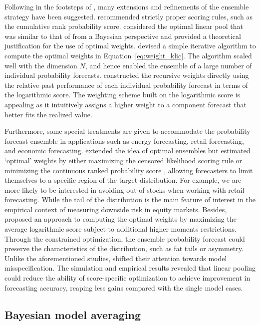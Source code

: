 \documentclass[11pt]{article}
\begin{document}
Following in the footsteps of \cite{Hall2007-lh}, many extensions and refinements of the ensemble strategy have been suggested. \cite{Gneiting2007-ij} recommended strictly proper scoring rules, such as the cumulative rank probability score. \cite{Geweke2011-xk} considered the optimal linear pool that was similar to that of \cite{Hall2007-lh} from a Bayesian perspective and provided a theoretical justification for the use of optimal weights. \cite{Conflitti2015-fq} devised a simple iterative algorithm to compute the optimal weights in Equation~\eqref{eq:weight_klic}. The algorithm scaled well with the dimension $N$, and hence enabled the ensemble of a large number of individual probability forecasts. \cite{Jore2010-yi} constructed the recursive weights directly using the relative past performance of each individual probability forecast in terms of the logarithmic score. The weighting scheme built on the logarithmic score is appealing as it intuitively assigns a higher weight to a component forecast that better fits the realized value.

Furthermore, some special treatments are given to accommodate the probability forecast ensemble in applications such as energy forecasting, retail forecasting, and economic forecasting. \cite{Opschoor2017-yu} extended the idea of optimal ensembles but estimated `optimal' weights by either maximizing the censored likelihood scoring rule \citep{Diks2011-gj} or minimizing the continuous ranked probability score \citep{Gneiting2014-tz}, allowing forecasters to limit themselves to a specific region of the target distribution. For example, we are more likely to be interested in avoiding out-of-stocks when working with retail forecasting. While the tail of the distribution is the main feature of interest in the empirical context of measuring downside risk in equity markets. Besides, \cite{Pauwels2020-zl} proposed an approach to computing the optimal weights by maximizing the average logarithmic score subject to additional higher moments restrictions. Through the constrained optimization, the ensemble probability forecast could preserve the characteristics of the distribution, such as fat tails or asymmetry. Unlike the aforementioned studies, \cite{Martin2021-yi} shifted their attention towards model misspecification. The simulation and empirical results revealed that linear pooling could reduce the ability of score-specific optimization to achieve improvement in forecasting accuracy, reaping less gains compared with the single model cases.

\subsection{Bayesian model averaging}
\label{sec:bayesian_model_averaging}
\end{document}
